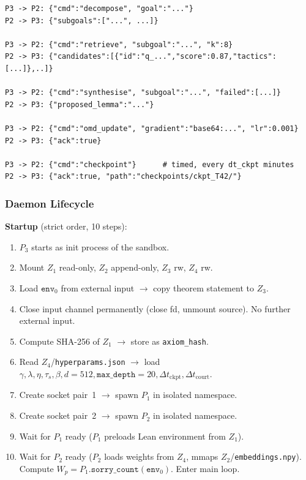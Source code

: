\documentclass[11pt,a4paper]{article}
\theoremstyle{definition}
\theoremstyle{remark}
\begin{document}
\begin{lstlisting}[caption={P3 $\leftrightarrow$ P2 protocol (NN commands)}]
P3 -> P2: {"cmd":"decompose", "goal":"..."}
P2 -> P3: {"subgoals":["...", ...]}

P3 -> P2: {"cmd":"retrieve", "subgoal":"...", "k":8}
P2 -> P3: {"candidates":[{"id":"q_...","score":0.87,"tactics":[...]},..]}

P3 -> P2: {"cmd":"synthesise", "subgoal":"...", "failed":[...]}
P2 -> P3: {"proposed_lemma":"..."}

P3 -> P2: {"cmd":"omd_update", "gradient":"base64:...", "lr":0.001}
P2 -> P3: {"ack":true}

P3 -> P2: {"cmd":"checkpoint"}      # timed, every dt_ckpt minutes
P2 -> P3: {"ack":true, "path":"checkpoints/ckpt_T42/"}
\end{lstlisting}


\subsubsection*{Daemon Lifecycle}

\textbf{Startup} (strict order, 10 steps):
\begin{enumerate}[nosep]
\item $P_3$ starts as init process of the sandbox.
\item Mount $Z_1$ read-only, $Z_2$ append-only, $Z_3$ rw, $Z_4$ rw.
\item Load $\texttt{env}_0$ from external input $\to$ copy theorem statement to $Z_3$.
\item Close input channel permanently (close fd, unmount source). No further external input.
\item Compute SHA-256 of $Z_1$ $\to$ store as \texttt{axiom\_hash}.
\item Read $Z_4$/\texttt{hyperparams.json} $\to$ load $\gamma, \lambda, \eta, \tau_s, \beta, d{=}512, \texttt{max\_depth}{=}20, \Delta t_{\mathrm{ckpt}}, \Delta t_{\mathrm{court}}$.
\item Create socket pair~1 $\to$ spawn $P_1$ in isolated namespace.
\item Create socket pair~2 $\to$ spawn $P_2$ in isolated namespace.
\item Wait for $P_1$ ready ($P_1$ preloads Lean environment from $Z_1$).
\item Wait for $P_2$ ready ($P_2$ loads weights from $Z_4$, mmaps $Z_2$/\texttt{embeddings.npy}). Compute $W_p = P_1.\texttt{sorry\_count}(\texttt{env}_0)$. Enter main loop.
\end{enumerate}
\end{document}

